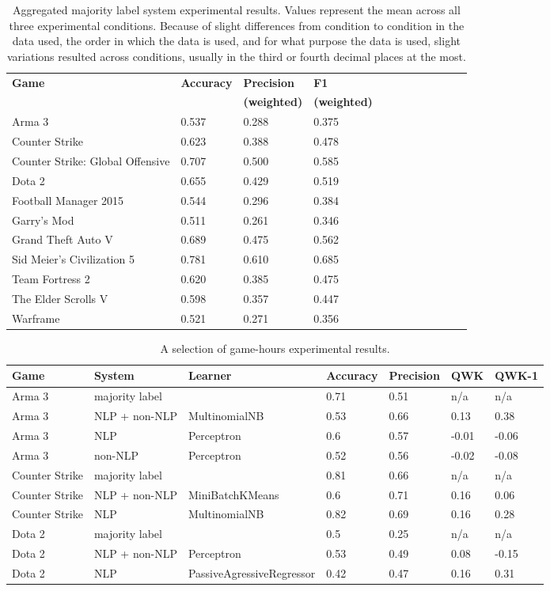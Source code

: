 \documentclass[9pt]{article}
\begin{document}
\begin{table*}[htbp]
\label{tab:majority}
\centering
\begin{tabular}{*{12}{l}}
\hline \bf Game & \bf Accuracy & \bf Precision & \bf F1 \\
& & \bf (weighted) & \bf (weighted) \\ \hline
Arma 3 & 0.537 & 0.288 & 0.375 \\
Counter Strike & 0.623 & 0.388 & 0.478 \\
Counter Strike: Global Offensive & 0.707 & 0.500 & 0.585 \\
Dota 2 & 0.655 & 0.429 & 0.519 \\
Football Manager 2015 & 0.544 & 0.296 & 0.384 \\
Garry's Mod & 0.511 & 0.261 & 0.346 \\
Grand Theft Auto V & 0.689 & 0.475 & 0.562 \\
Sid Meier's Civilization 5 & 0.781 & 0.610 & 0.685 \\
Team Fortress 2 & 0.620 & 0.385 & 0.475 \\
The Elder Scrolls V & 0.598 & 0.357 & 0.447 \\
Warframe & 0.521 & 0.271 & 0.356 \\ \hline
\end{tabular}
\caption{Aggregated majority label system experimental results. Values represent the mean across all three experimental conditions. Because of slight differences from condition to condition in the data used, the order in which the data is used, and for what purpose the data is used, slight variations resulted across conditions, usually in the third or fourth decimal places at the most.}
\end{table*}

\begin{table*}[htbp]
\label{tab:gamehours}
\centering
\begin{tabular}{*{7}{l}}
\hline \bf Game & \bf System & \bf Learner & \bf Accuracy & \bf Precision & \bf QWK & \bf QWK-1 \\ \hline
Arma 3 & majority label &  & 0.71 & 0.51 & n/a & n/a \\
Arma 3 & NLP + non-NLP & MultinomialNB & 0.53 & 0.66 & 0.13 & 0.38 \\
Arma 3 & NLP & Perceptron & 0.6 & 0.57 & -0.01 & -0.06 \\
Arma 3 & non-NLP & Perceptron & 0.52 & 0.56 & -0.02 & -0.08 \\
Counter Strike & majority label &  & 0.81 & 0.66 & n/a & n/a \\
Counter Strike & NLP + non-NLP & MiniBatchKMeans & 0.6 & 0.71 & 0.16 & 0.06 \\
Counter Strike & NLP & MultinomialNB & 0.82 & 0.69 & 0.16 & 0.28 \\
Dota 2 & majority label &  & 0.5 & 0.25 & n/a & n/a \\
Dota 2 & NLP + non-NLP & Perceptron & 0.53 & 0.49 & 0.08 & -0.15 \\
Dota 2 & NLP & PassiveAgressiveRegressor & 0.42 & 0.47 & 0.16 & 0.31 \\ \hline
\end{tabular}
\caption{A selection of game-hours experimental results.}
\end{table*}
\end{document}
